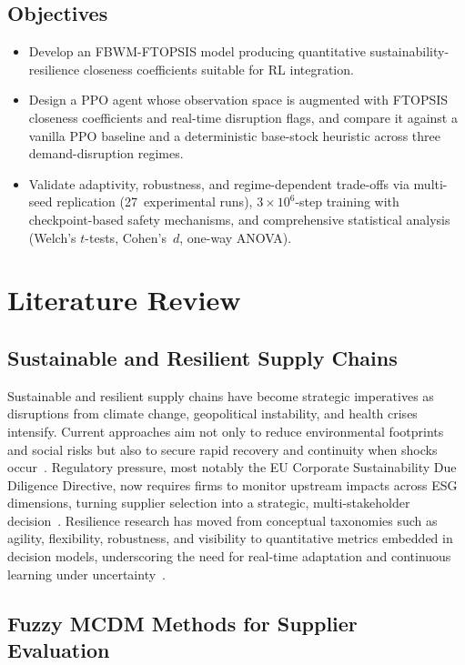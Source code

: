 \documentclass[preprint,12pt]{elsarticle}
\begin{document}
\subsection{Objectives}
\begin{itemize}
\item Develop an FBWM-FTOPSIS model producing quantitative sustainability-resilience closeness coefficients suitable for RL integration.
\item Design a PPO agent whose observation space is augmented with FTOPSIS closeness coefficients and real-time disruption flags, and compare it against a vanilla PPO baseline and a deterministic base-stock heuristic across three demand-disruption regimes.
\item Validate adaptivity, robustness, and regime-dependent trade-offs via multi-seed replication (27~experimental runs), $3\!\times\!10^{6}$-step training with checkpoint-based safety mechanisms, and comprehensive statistical analysis (Welch's $t$-tests, Cohen's~$d$, one-way ANOVA).
\end{itemize}

\section{Literature Review}

\subsection{Sustainable and Resilient Supply Chains}
Sustainable and resilient supply chains have become strategic imperatives as disruptions from climate change, geopolitical instability, and health crises intensify. Current approaches aim not only to reduce environmental footprints and social risks but also to secure rapid recovery and continuity when shocks occur~\citep{Ivanov_Dolgui_2021}. Regulatory pressure, most notably the EU Corporate Sustainability Due Diligence Directive, now requires firms to monitor upstream impacts across ESG dimensions, turning supplier selection into a strategic, multi-stakeholder decision~\citep{European_Commission_2023}. Resilience research has moved from conceptual taxonomies such as agility, flexibility, robustness, and visibility to quantitative metrics embedded in decision models, underscoring the need for real-time adaptation and continuous learning under uncertainty~\citep{Dubey_etal_2021}.

\subsection{Fuzzy MCDM Methods for Supplier Evaluation}
\end{document}
